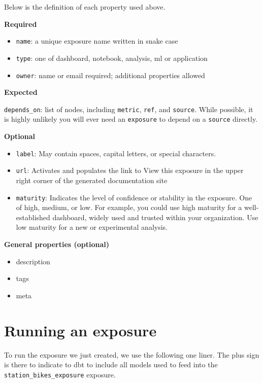 \documentclass[
]{book}
\providecommand{\tightlist}{%
  \setlength{\itemsep}{0pt}\setlength{\parskip}{0pt}}
\begin{document}
Below is the definition of each property used above.

\textbf{Required}

\begin{itemize}
\item
  \texttt{name}: a unique exposure name written in snake case
\item
  \texttt{type}: one of dashboard, notebook, analysis, ml or application
\item
  \texttt{owner}: name or email required; additional properties allowed
\end{itemize}

\textbf{Expected}

\texttt{depends\_on}: list of nodes, including \texttt{metric}, \texttt{ref}, and \texttt{source}. While possible, it is highly unlikely you will ever need an \texttt{exposure} to depend on a \texttt{source} directly.

\textbf{Optional}

\begin{itemize}
\item
  \texttt{label}: May contain spaces, capital letters, or special characters.
\item
  \texttt{url}: Activates and populates the link to View this exposure in the upper right corner of the generated documentation site
\item
  \texttt{maturity}: Indicates the level of confidence or stability in the exposure. One of high, medium, or low. For example, you could use high maturity for a well-established dashboard, widely used and trusted within your organization. Use low maturity for a new or experimental analysis.
\end{itemize}

\textbf{General properties (optional)}

\begin{itemize}
\tightlist
\item
  description
\item
  tags
\item
  meta
\end{itemize}

\hypertarget{running-an-exposure}{%
\section{Running an exposure}\label{running-an-exposure}}

To run the exposure we just created, we use the following one liner. The plus sign is there to indicate to dbt to include all models used to feed into the \texttt{station\_bikes\_exposure} exposure.
\end{document}
